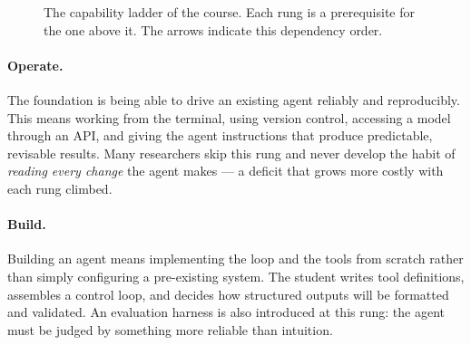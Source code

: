 \begin{figure}[htb!]
\begin{center}
\caption{The capability ladder of the course.
Each rung is a prerequisite for the one above it.
The arrows indicate this dependency order.}
\label{figure:CapabilityLadder}
\end{center}
\end{figure}

\paragraph{Operate.}
The foundation is being able to drive an existing agent reliably and reproducibly.
This means working from the terminal, using version control, accessing a model through an API, and giving the agent instructions that produce predictable, revisable results.
Many researchers skip this rung and never develop the habit of \emph{reading every change} the agent makes — a deficit that grows more costly with each rung climbed.

\paragraph{Build.}
Building an agent means implementing the loop and the tools from scratch rather than simply configuring a pre-existing system.
The student writes tool definitions, assembles a control loop, and decides how structured outputs will be formatted and validated.
An evaluation harness is also introduced at this rung: the agent must be judged by something more reliable than intuition.

